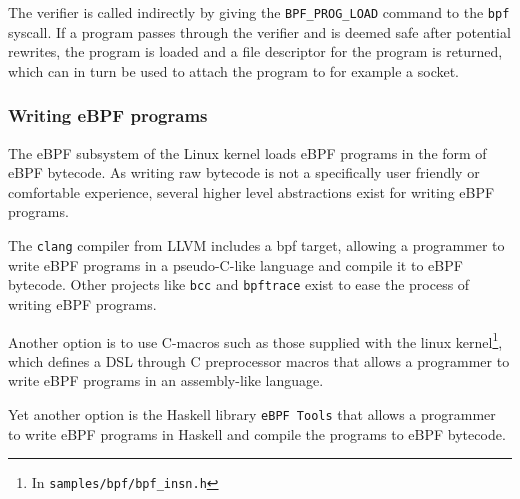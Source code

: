 The verifier is called indirectly by giving the \verb!BPF_PROG_LOAD! command to the \verb!bpf! syscall. 
If a program passes through the verifier and is deemed safe after potential rewrites, the program is loaded and a file descriptor for the program is returned, which can in turn be used to attach the program to for example a socket. 



\subsubsection*{Writing eBPF programs}
The eBPF subsystem of the Linux kernel loads eBPF programs in the form of eBPF bytecode. As writing raw bytecode is not a specifically user friendly or comfortable experience, several higher level abstractions exist for writing eBPF programs. 

The \texttt{clang} compiler from LLVM includes a bpf target, allowing a programmer to write eBPF programs in a pseudo-C-like language and compile it to eBPF bytecode.
Other projects like \texttt{bcc}\cite{gh:bcc} and \texttt{bpftrace}\cite{gh:bpftrace} exist to ease the process of writing eBPF programs.

Another option is to use C-macros such as those supplied with the linux kernel\footnote{In \texttt{samples/bpf/bpf\_insn.h}}, which defines a DSL through C preprocessor macros that allows a programmer to write eBPF programs in an assembly-like language.

Yet another option is the Haskell library \texttt{eBPF Tools}\cite{ebpf-tools} that allows a programmer to write eBPF programs in Haskell and compile the programs to eBPF bytecode.  

 

  

